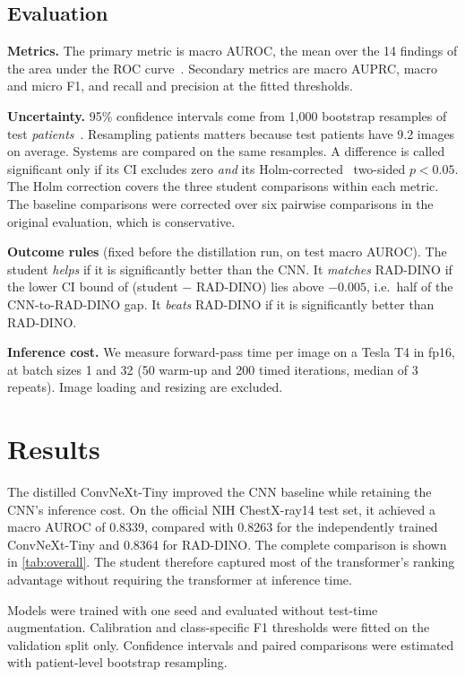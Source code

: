 \documentclass[conference]{IEEEtran}
\begin{document}
\subsection{Evaluation}
\textbf{Metrics.} The primary metric is macro AUROC, the mean over the 14 findings of the area under the ROC curve~\cite{hanley1982meaning}. Secondary metrics are macro AUPRC, macro and micro F1, and recall and precision at the fitted thresholds.

\textbf{Uncertainty.} 95\% confidence intervals come from 1,000 bootstrap resamples of test \emph{patients}~\cite{efron1993bootstrap}. Resampling patients matters because test patients have 9.2 images on average. Systems are compared on the same resamples. A difference is called significant only if its CI excludes zero \emph{and} its Holm-corrected~\cite{holm1979simple} two-sided $p<0.05$. The Holm correction covers the three student comparisons within each metric. The baseline comparisons were corrected over six pairwise comparisons in the original evaluation, which is conservative.

\textbf{Outcome rules} (fixed before the distillation run, on test macro AUROC). The student \emph{helps} if it is significantly better than the CNN. It \emph{matches} RAD-DINO if the lower CI bound of (student $-$ RAD-DINO) lies above $-0.005$, i.e.\ half of the CNN-to-RAD-DINO gap. It \emph{beats} RAD-DINO if it is significantly better than RAD-DINO.

\textbf{Inference cost.} We measure forward-pass time per image on a Tesla T4 in fp16, at batch sizes 1 and 32 (50 warm-up and 200 timed iterations, median of 3 repeats). Image loading and resizing are excluded.

\section{Results}
\label{sec:results}

The distilled ConvNeXt-Tiny improved the CNN baseline while retaining the
CNN's inference cost. On the official NIH ChestX-ray14 test set, it achieved a
macro AUROC of 0.8339, compared with 0.8263 for the independently trained
ConvNeXt-Tiny and 0.8364 for RAD-DINO. The complete comparison is shown in
\cref{tab:overall}. The student therefore captured most of the transformer's
ranking advantage without requiring the transformer at inference time.

Models were trained with one seed and evaluated
without test-time augmentation. Calibration and class-specific F1 thresholds
were fitted on the validation split only. Confidence intervals and paired
comparisons were estimated with patient-level bootstrap resampling.
\end{document}
